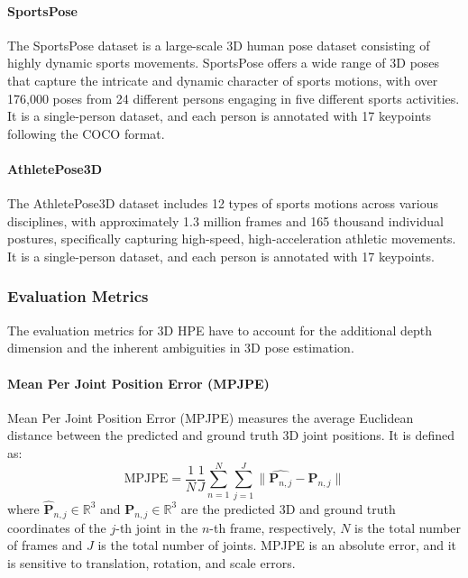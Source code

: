 \paragraph{SportsPose}
The SportsPose dataset \cite{ingwersen2023sportspose} is a large-scale 3D human pose dataset consisting of highly dynamic sports movements.
SportsPose offers a wide range of 3D poses that capture the intricate and dynamic character of sports motions, with over 176,000 poses from 24 different persons engaging in five different sports activities.
It is a single-person dataset, and each person is annotated with 17 keypoints following the COCO format.

\paragraph{AthletePose3D}
The AthletePose3D dataset \cite{yeung2025athletepose3d} includes 12 types of sports motions across various disciplines, with approximately 1.3 million frames and 165 thousand individual postures, specifically capturing high-speed, 
high-acceleration athletic movements. It is a single-person dataset, and each person is annotated with 17 keypoints.


\subsubsection{Evaluation Metrics}
The evaluation metrics for 3D HPE have to account for the additional depth dimension and the inherent ambiguities in 3D pose estimation.

\paragraph{Mean Per Joint Position Error (MPJPE)}
\label{mpjpe}
Mean Per Joint Position Error (MPJPE) measures the average Euclidean distance between the predicted and ground truth 3D joint positions. It is defined as:
\begin{equation}
    \text{MPJPE} = \frac{1}{N} \frac{1}{J} \sum_{n=1}^{N} \sum_{j=1}^{J} \| \hat{\mathbf{P}_{n,j}} - \mathbf{P}_{n,j} \|
\end{equation}
where \(\hat{\mathbf{P}}_{n,j} \in \mathbb{R}^3\) and \(\mathbf{P}_{n,j} \in \mathbb{R}^3\) are the predicted 3D and ground truth coordinates of the \(j\)-th joint in the \(n\)-th frame, respectively, \(N\) is the total number of 
frames and \(J\) is the total number of joints. MPJPE is an absolute error, and it is sensitive to translation, rotation, and scale errors.

